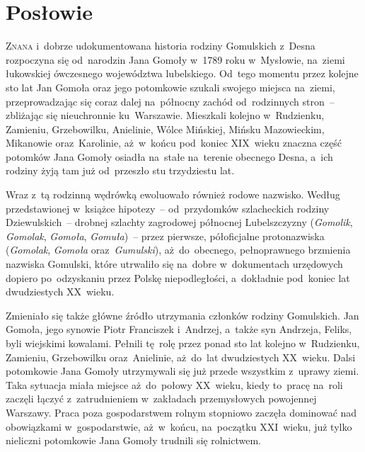 
\cleardoublepage
\chapter*{Posłowie}
\thispagestyle{plain}


\lettrine{Z}{nana} i~dobrze udokumentowana historia rodziny Gomulskich z~Desna
rozpoczyna się od~narodzin Jana Gomoły w~1789 roku w~Mysłowie, na~ziemi
łukowskiej ówczesnego województwa lubelskiego. Od~tego momentu przez kolejne
sto lat Jan Gomoła oraz jego potomkowie szukali swojego miejsca na~ziemi,
przeprowadzając się coraz dalej na~północny zachód od~rodzinnych stron~--
zbliżając się nieuchronnie ku~Warszawie. Mieszkali kolejno w~Rudzienku,
Zamieniu, Grzebowilku, Anielinie, Wólce Mińskiej, Mińsku Mazowieckim,
Mikanowie oraz~Karolinie, aż~w~końcu pod~koniec XIX~wieku znaczna część
potomków Jana Gomoły osiadła na~stałe na~terenie obecnego Desna, a~ich
rodziny żyją tam już od~przeszło stu trzydziestu lat.

Wraz z~tą rodzinną wędrówką ewoluowało również rodowe nazwisko. Według
przedstawionej w~książce hipotezy~-- od~przydomków szlacheckich rodziny
Dziewulskich~-- drobnej szlachty zagrodowej północnej Lubelszczyzny
(\emph{Gomolik}, \emph{Gomolak}, \emph{Gomoła}, \emph{Gomuła})~-- przez
pierwsze, półoficjalne protonazwiska (\emph{Gomolak}, \emph{Gomoła}
oraz~\emph{Gumulski}), aż~do~obecnego, pełnoprawnego brzmienia nazwiska
Gomulski, które utrwaliło się na~dobre w~dokumentach urzędowych dopiero
po~odzyskaniu przez Polskę niepodległości, a~dokładnie pod~koniec lat
dwudziestych XX~wieku.

Zmieniało się także główne źródło utrzymania członków rodziny Gomulskich.
Jan Gomoła, jego synowie Piotr Franciszek i~Andrzej, a~także syn Andrzeja,
Feliks, byli wiejskimi kowalami. Pełnili tę~rolę przez ponad sto lat kolejno
w~Rudzienku, Zamieniu, Grzebowilku oraz~Anielinie, aż~do~lat dwudziestych
XX~wieku. Dalsi potomkowie Jana Gomoły utrzymywali się już przede wszystkim
z~uprawy ziemi. Taka sytuacja miała miejsce aż~do~połowy XX~wieku, kiedy
to~pracę na~roli zaczęli łączyć z~zatrudnieniem w~zakładach przemysłowych
powojennej Warszawy. Praca poza gospodarstwem rolnym stopniowo zaczęła
dominować nad obowiązkami w~gospodarstwie, aż~w~końcu, na~początku XXI~wieku,
już tylko nieliczni potomkowie Jana Gomoły trudnili się rolnictwem.

